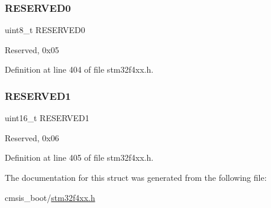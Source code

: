 \subsubsection{\texorpdfstring{R\+E\+S\+E\+R\+V\+E\+D0}{RESERVED0}}
{\footnotesize\ttfamily uint8\+\_\+t R\+E\+S\+E\+R\+V\+E\+D0}

Reserved, 0x05 

Definition at line 404 of file stm32f4xx.\+h.

\mbox{\label{struct_c_r_c___type_def_a8249a3955aace28d92109b391311eb30}} 
\subsubsection{\texorpdfstring{R\+E\+S\+E\+R\+V\+E\+D1}{RESERVED1}}
{\footnotesize\ttfamily uint16\+\_\+t R\+E\+S\+E\+R\+V\+E\+D1}

Reserved, 0x06 

Definition at line 405 of file stm32f4xx.\+h.



The documentation for this struct was generated from the following file\+:\begin{DoxyCompactItemize}
\item 
cmsis\+\_\+boot/\hyperlink{stm32f4xx_8h}{stm32f4xx.\+h}\end{DoxyCompactItemize}
